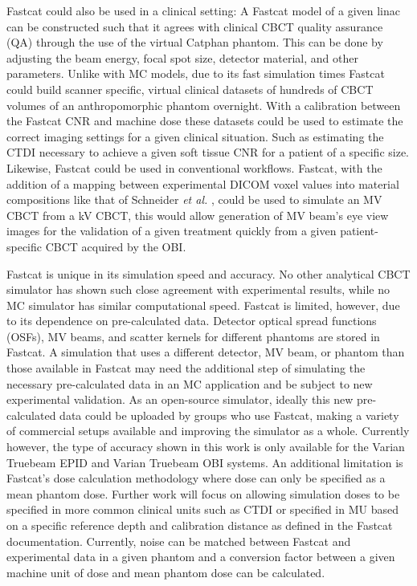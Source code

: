 Fastcat could also be used in a clinical setting: A Fastcat model of a given linac can be constructed such that it agrees with clinical CBCT quality assurance (QA) through the use of the virtual Catphan phantom. This can be done by adjusting the beam energy, focal spot size, detector material, and other parameters. Unlike with MC models, due to its fast simulation times Fastcat could build scanner specific, virtual clinical datasets of hundreds of CBCT volumes of an anthropomorphic phantom overnight. With a calibration between the Fastcat CNR and machine dose these datasets could be used to estimate the correct imaging settings for a given clinical situation. Such as estimating the CTDI necessary to achieve a given soft tissue CNR for a patient of a specific size. Likewise, Fastcat could be used in conventional workflows. Fastcat, with the addition of a mapping between experimental DICOM voxel values into material compositions like that of Schneider \textit{et al.} \cite{Schneider2000CorrelationDistributions}, could be used to simulate an MV CBCT from a kV CBCT, this would allow generation of MV beam's eye view images for the validation of a given treatment quickly from a given patient-specific CBCT acquired by the OBI.

Fastcat is unique in its simulation speed and accuracy. No other analytical CBCT simulator has shown such close agreement with experimental results, while no MC simulator has similar computational speed. Fastcat is limited, however, due to its dependence on pre-calculated data. Detector optical spread functions (OSFs), MV beams, and scatter kernels for different phantoms are stored in Fastcat. A simulation that uses a different detector, MV beam, or phantom than those available in Fastcat may need the additional step of simulating the necessary pre-calculated data in an MC application and be subject to new experimental validation. As an open-source simulator, ideally this new pre-calculated data could be uploaded by groups who use Fastcat, making a variety of commercial setups available and improving the simulator as a whole. Currently however, the type of accuracy shown in this work is only available for the Varian Truebeam EPID and Varian Truebeam OBI systems. An additional limitation is Fastcat's dose calculation methodology where dose can only be specified as a mean phantom dose. Further work will focus on allowing simulation doses to be specified in more common clinical units such as CTDI or specified in MU based on a specific reference depth and calibration distance as defined in the Fastcat documentation. Currently, noise can be matched between Fastcat and experimental data in a given phantom and a conversion factor between a given machine unit of dose and mean phantom dose can be calculated. 

